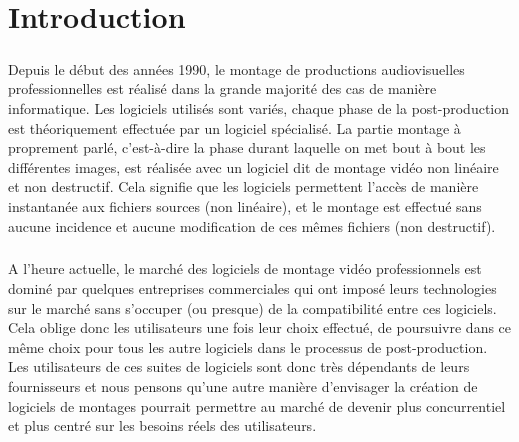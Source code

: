 








\setcounter{page}{1} \newpage \chapter*{Introduction}

\paragraph{}

Depuis le début des années 1990, le montage de
productions audiovisuelles professionnelles est réalisé dans la grande
majorité des cas de manière informatique. Les logiciels utilisés
sont variés, chaque phase de la post-production est théoriquement
effectuée par un logiciel spécialisé. La partie montage à proprement
parlé, c'est-à-dire la phase durant laquelle on met bout à bout
les différentes images, est réalisée avec un logiciel dit de montage
vidéo non linéaire et non destructif. Cela signifie que les logiciels
permettent l'accès de manière instantanée aux
fichiers sources (non linéaire), et le montage est effectué sans aucune
incidence et aucune modification de ces mêmes fichiers (non destructif).

\paragraph{}

A l'heure actuelle, le marché des logiciels de montage vidéo
professionnels est dominé par quelques entreprises commerciales qui ont
imposé leurs technologies sur le marché sans s'occuper (ou presque)
de la compatibilité entre ces logiciels.  Cela oblige donc
les utilisateurs une fois leur choix effectué, de poursuivre
dans ce même choix pour tous les autre logiciels
dans le processus de post-production. Les utilisateurs de ces suites
de logiciels sont donc très dépendants de leurs fournisseurs et nous
pensons qu'une autre manière d'envisager la création de logiciels de
montages pourrait permettre au marché de devenir plus concurrentiel et
plus centré sur les besoins réels des utilisateurs.

